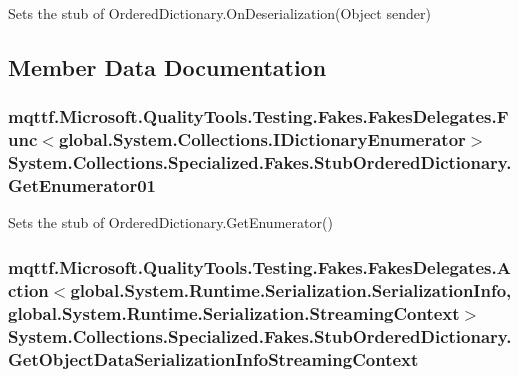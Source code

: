 Sets the stub of Ordered\-Dictionary.\-On\-Deserialization(\-Object sender)



\subsection{Member Data Documentation}
\hypertarget{class_system_1_1_collections_1_1_specialized_1_1_fakes_1_1_stub_ordered_dictionary_a7e52efed0a0f4ab696e66f72f31304d6}{
\subsubsection[{Get\-Enumerator01}]{\setlength{\rightskip}{0pt plus 5cm}mqttf.\-Microsoft.\-Quality\-Tools.\-Testing.\-Fakes.\-Fakes\-Delegates.\-Func$<$global.\-System.\-Collections.\-I\-Dictionary\-Enumerator$>$ System.\-Collections.\-Specialized.\-Fakes.\-Stub\-Ordered\-Dictionary.\-Get\-Enumerator01}}\label{class_system_1_1_collections_1_1_specialized_1_1_fakes_1_1_stub_ordered_dictionary_a7e52efed0a0f4ab696e66f72f31304d6}


Sets the stub of Ordered\-Dictionary.\-Get\-Enumerator()

\hypertarget{class_system_1_1_collections_1_1_specialized_1_1_fakes_1_1_stub_ordered_dictionary_adc9bfe3cc1623cf60d0b2b117ada4498}{
\subsubsection[{Get\-Object\-Data\-Serialization\-Info\-Streaming\-Context}]{\setlength{\rightskip}{0pt plus 5cm}mqttf.\-Microsoft.\-Quality\-Tools.\-Testing.\-Fakes.\-Fakes\-Delegates.\-Action$<$global.\-System.\-Runtime.\-Serialization.\-Serialization\-Info, global.\-System.\-Runtime.\-Serialization.\-Streaming\-Context$>$ System.\-Collections.\-Specialized.\-Fakes.\-Stub\-Ordered\-Dictionary.\-Get\-Object\-Data\-Serialization\-Info\-Streaming\-Context}}\label{class_system_1_1_collections_1_1_specialized_1_1_fakes_1_1_stub_ordered_dictionary_adc9bfe3cc1623cf60d0b2b117ada4498}


